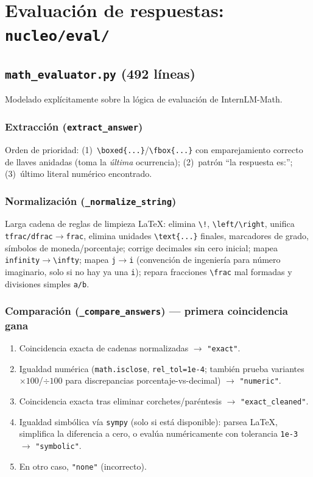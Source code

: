 \documentclass[11pt,a4paper]{report}
\newcommand{\code}[1]{\texttt{#1}}
\begin{document}
\chapter{Evaluaci\'on de respuestas: \code{nucleo/eval/}}

\section{\code{math_evaluator.py} (492 l\'ineas)}

Modelado expl\'icitamente sobre la l\'ogica de evaluaci\'on de InternLM-Math.

\subsection{Extracci\'on (\code{extract_answer})}
Orden de prioridad: (1)~\code{\textbackslash boxed\{...\}}/\code{\textbackslash fbox\{...\}} con emparejamiento correcto de llaves anidadas (toma la \emph{\'ultima} ocurrencia); (2)~patr\'on ``la respuesta es:''; (3)~\'ultimo literal num\'erico encontrado.

\subsection{Normalizaci\'on (\code{\_normalize_string})}
Larga cadena de reglas de limpieza LaTeX: elimina \code{\textbackslash!}, \code{\textbackslash left/\textbackslash right}, unifica \code{tfrac/dfrac}$\to$\code{frac}, elimina unidades \code{\textbackslash text\{...\}} finales, marcadores de grado, s\'imbolos de moneda/porcentaje; corrige decimales sin cero inicial; mapea \code{infinity}$\to$\code{\textbackslash infty}; mapea \code{j}$\to$\code{i} (convenci\'on de ingenier\'ia para n\'umero imaginario, solo si no hay ya una \code{i}); repara fracciones \code{\textbackslash frac} mal formadas y divisiones simples \code{a/b}.

\subsection{Comparaci\'on (\code{\_compare_answers}) --- primera coincidencia gana}
\begin{enumerate}
  \item Coincidencia exacta de cadenas normalizadas $\to$ \code{"exact"}.
  \item Igualdad num\'erica (\code{math.isclose}, \code{rel\_tol=1e-4}; tambi\'en prueba variantes $\times100$/$\div100$ para discrepancias porcentaje-vs-decimal) $\to$ \code{"numeric"}.
  \item Coincidencia exacta tras eliminar corchetes/par\'entesis $\to$ \code{"exact_cleaned"}.
  \item Igualdad simb\'olica v\'ia \code{sympy} (solo si est\'a disponible): parsea LaTeX, simplifica la diferencia a cero, o eval\'ua num\'ericamente con tolerancia \code{1e-3} $\to$ \code{"symbolic"}.
  \item En otro caso, \code{"none"} (incorrecto).
\end{enumerate}
\end{document}
